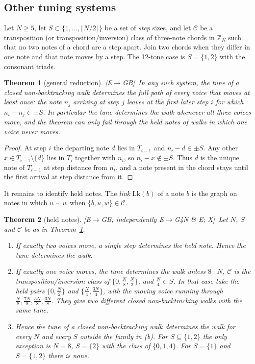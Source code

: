 \documentclass[11pt]{amsart}
\numberwithin{equation}{section}
\theoremstyle{plain}
\newtheorem{theorem}{Theorem}[section]
\theoremstyle{definition}\newtheorem{definition}[theorem]{Definition}
\theoremstyle{remark}\newtheorem{remark}[theorem]{Remark}
\newcommand{\Z}{\mathbb{Z}}\newcommand{\Q}{\mathbb{Q}}\newcommand{\C}{\mathbb{C}}\newcommand{\F}{\mathbb{F}}\newcommand{\R}{\mathbb{R}}
\newcommand{\ctag}[1]{\textup{\textsf{\scriptsize[#1]}}}
\begin{document}
\subsection{Other tuning systems}\label{sec:tunegen}
Let $N\ge5$, let $S\subset\{1,\dots,\lfloor N/2\rfloor\}$ be a set of \emph{step} sizes, and let $\mathcal C$ be a transposition (or transposition/inversion) class of three-note chords in $\Z_N$ such that no two notes of a chord are a step apart. Join two chords when they differ in one note and that note moves by a step. The 12-tone case is $S=\{1,2\}$ with the consonant triads.
\begin{theorem}[general reduction]\label{thm:tunegen}
\ctag{E$\to$GB}\ In any such system, the tune of a closed non-backtracking walk determines the full path of every voice that moves at least once: the note $n_j$ arriving at step $j$ leaves at the first later step $i$ for which $n_i-n_j\in\pm S$. In particular the tune determines the walk whenever all three voices move, and the theorem can only fail through the held notes of walks in which one voice never moves.
\end{theorem}
\begin{proof}
At step $i$ the departing note $d$ lies in $T_{i-1}$ and $n_i-d\in\pm S$. Any other $x\in T_{i-1}\setminus\{d\}$ lies in $T_i$ together with $n_i$, so $n_i-x\notin\pm S$. Thus $d$ is the unique note of $T_{i-1}$ at step distance from $n_i$, and a note present in the chord stays until the first arrival at step distance from it.
\end{proof}
It remains to identify held notes. The \emph{link} $\mathrm{Lk}(b)$ of a note $b$ is the graph on notes in which $u\sim w$ when $\{b,u,w\}\in\mathcal C$.
\begin{theorem}[held notes]\label{thm:held}
\ctag{E$\to$GB; independently E$\to$G4N \& E; X}\ Let $N$, $S$ and $\mathcal C$ be as in Theorem~\ref{thm:tunegen}.
\begin{enumerate}[label=(\alph*),nosep]
\item If exactly two voices move, a single step determines the held note. Hence the tune determines the walk.
\item If exactly one voice moves, the tune determines the walk unless $8\mid N$, $\mathcal C$ is the transposition/inversion class of $\{0,\frac N8,\frac N2\}$, and $\frac N4\in S$. In that case take the held pairs $\{0,\frac N2\}$ and $\{\frac N4,\frac{3N}4\}$, with the moving voice running through $\frac N8,\frac{7N}8,\frac{5N}8,\frac{3N}8$. They give two different closed non-backtracking walks with the same tune.
\item Hence the tune of a closed non-backtracking walk determines the walk for every $N$ and every $S$ outside the family in (b). For $S\subseteq\{1,2\}$ the only exception is $N=8$, $S=\{2\}$ with the class of $\{0,1,4\}$. For $S=\{1\}$ and $S=\{1,2\}$ there is none.
\end{enumerate}
\end{theorem}
\end{document}
